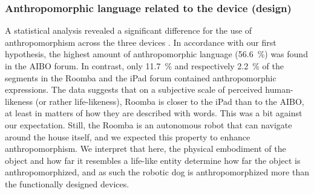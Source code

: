 \documentclass{frontiersSCNS} %
\begin{document}


\subsubsection{Anthropomorphic language related to the device (design)\\}

A statistical analysis revealed a significant difference for the use of
anthropomorphism across the three devices \citep{fink_anthropomorphic_2012}. In
accordance with our first hypothesis, the highest amount of anthropomorphic
language (56.6~\%) was found in the AIBO forum. In contrast, only 11.7~\% and
respectively 2.2~\% of the segments in the Roomba and the iPad forum contained
anthropomorphic expressions.  The data suggests that on a subjective scale of
perceived human-likeness (or rather life-likeness), Roomba is closer to the iPad
than to the AIBO, at least in matters of how they are described with words. This
was a bit against our expectation. Still, the Roomba is an autonomous robot that
can navigate around the house itself, and we expected this property to enhance
anthropomorphism. We interpret that here, the physical embodiment of the object
and how far it resembles a life-like entity determine how far the object is
anthropomorphized, and as such the robotic dog is anthropomorphized more than
the functionally designed devices.
\end{document}
